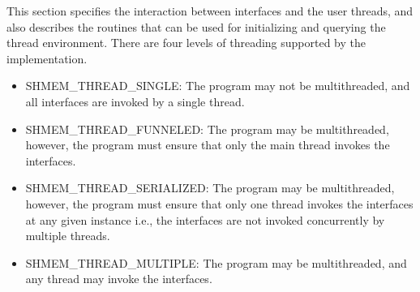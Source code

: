 This section specifies the interaction between \openshmem{} interfaces and the
user threads, and also describes the routines that can be used for initializing and 
querying the thread environment. There are four levels of threading supported by
the \openshmem{} implementation.
 
\begin{itemize}
\item SHMEM\_THREAD\_SINGLE: The \openshmem{} program may not be multithreaded, 
and all \openshmem{} interfaces are invoked by a single thread. 

\item SHMEM\_THREAD\_FUNNELED: 
The \openshmem{} program may be multithreaded, however, the 
program must ensure that only the main thread invokes the \openshmem{}
interfaces.

\item SHMEM\_THREAD\_SERIALIZED: 
The \openshmem{} program may be multithreaded, however, the 
program must ensure that only one thread invokes the \openshmem{}
interfaces at any given instance i.e., the \openshmem{} interfaces 
are not invoked concurrently by multiple threads.

\item SHMEM\_THREAD\_MULTIPLE: 
The \openshmem{} program may be multithreaded, and any 
thread may invoke the \openshmem{} interfaces.
\end{itemize}


